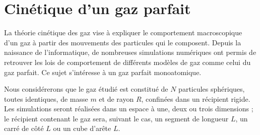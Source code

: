 \chapter{Cinétique d'un gaz parfait}
\vskip -2cm

{\sf
La théorie cinétique des gaz vise à expliquer le comportement
macroscopique d'un gaz à partir des mouvements des particules qui le
composent. Depuis la naissance de l'informatique, de nombreuses
simulations numériques ont permis de retrouver les lois de
comportement de différents modèles de gaz comme celui du gaz parfait.
Ce sujet s'intéresse à un gaz parfait monoatomique. 

Nous considérerons
que le gaz étudié est constitué de $N$ particules sphériques, toutes
identiques, de masse $m$ et de rayon $R$, confinées dans un récipient
rigide. Les simulations seront réalisées dans un espace à une, deux ou
trois dimensions ; le récipient contenant le gaz sera, suivant le cas,
un segment de longueur $L$, un carré de côté $L$ ou un cube d'arête $L$.
}

